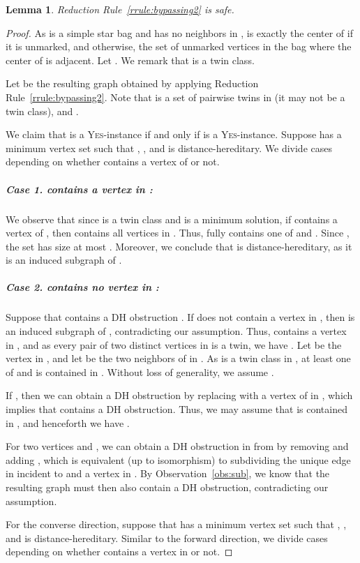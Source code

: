 \documentclass[11pt]{elsarticle}
\newtheorem{lemma}[theorem]{Lemma}
\newcommand{\YES}{\textsc{Yes}}
\begin{document}
\begin{lemma}
\label{lem:bypassing2}
Reduction Rule~\ref{rrule:bypassing2} is safe.
\end{lemma}
\begin{proof}
As  is a simple star bag and  has no neighbors in , 
 is exactly 
the center of  if it is unmarked, and otherwise, the set of unmarked vertices in the bag where the center of  is adjacent.
Let . 
We remark that  is a twin class. 


Let  be the resulting graph obtained by applying Reduction Rule~\ref{rrule:bypassing2}.
Note that  is a set of pairwise twins in  (it may not be a twin class), 
and .

We claim that  is a \YES-instance if and only if  is a \YES-instance.
Suppose  has a minimum vertex set  such that , , and  is distance-hereditary.
We divide cases depending on whether  contains a vertex of  or not.

\subparagraph{\textbf{Case 1.}  contains a vertex in :}  
We observe that since  is a twin class and  is a minimum solution, 
if  contains a vertex of , then  contains all vertices in .
Thus,   fully contains one of  and .
Since , the set  has size at most . Moreover, we conclude that
 is distance-hereditary, as it is an induced subgraph of . 


\subparagraph{\textbf{Case 2.}  contains no vertex in :}  

Suppose that  contains a DH obstruction .
If  does not contain a vertex in , then  is an induced subgraph of , contradicting our assumption.
Thus,  contains a vertex in , and as every pair of two distinct vertices in  is a twin, we have .
Let  be the vertex in , and let  be the two neighbors of  in . As  is a twin class in , 
at least one of  and  is contained in . Without loss of generality, we assume .

If , then we can obtain a DH obstruction by replacing  with a vertex of  in ,
which implies that  contains a DH obstruction. Thus, we may assume that  is contained in , and henceforth we have .


For two vertices  and , 
we can obtain a DH obstruction in  from  by removing  and adding , which is equivalent (up to isomorphism) to subdividing the unique edge in  incident to  and a vertex in . By Observation~\ref{obs:sub}, we know that the resulting graph  must then also contain a DH obstruction, contradicting our assumption.

\medskip

For the converse direction, suppose that  has a minimum vertex set  such that , , and  is distance-hereditary.
Similar to the forward direction, we divide cases depending on whether  contains a vertex in  or not.


\end{proof}
\end{document}
